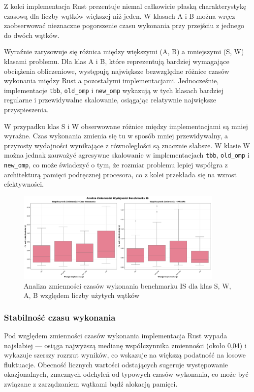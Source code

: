 Z kolei implementacja Rust prezentuje niemal całkowicie płaską charakterystykę czasową dla liczby wątków większej niż jeden. W klasach A i B można wręcz zaobserwować nieznaczne pogorszenie czasu wykonania przy przejściu z jednego do dwóch wątków.

Wyraźnie zarysowuje się różnica między większymi (A, B) a mniejszymi (S, W) klasami problemu. Dla klas A i B, które reprezentują bardziej wymagające obciążenia obliczeniowe, występują największe bezwzględne różnice czasów wykonania między Rust a pozostałymi implementacjami. Jednocześnie, implementacje \texttt{tbb}, \texttt{old\_omp} i \texttt{new\_omp} wykazują w tych klasach bardziej regularne i przewidywalne skalowanie, osiągając relatywnie największe przyspieszenia.

W przypadku klas S i W obserwowane różnice między implementacjami są mniej wyraźne. Czas wykonania zmienia się tu w sposób mniej przewidywalny, a przyrosty wydajności wynikające z równoległości są znacznie słabsze. W klasie W można jednak zauważyć agresywne skalowanie w implementacjach \texttt{tbb}, \texttt{old\_omp} i \texttt{new\_omp}, co może świadczyć o tym, że rozmiar problemu lepiej współgra z architekturą pamięci podręcznej procesora, co z kolei przekłada się na wzrost efektywności.

\begin{figure}[H]
    \centering
    \includegraphics[width=0.9\textwidth]{analiza/images/parallel/is/x86/is_analiza_zmiennosci.png}
    \caption{Analiza zmienności czasów wykonania benchmarku IS dla klas S, W, A, B względem liczby użytych wątków}
    \label{is_analiza_zmiennosci_x86}
\end{figure}
\subsubsection{Stabilność czasu wykonania}
Pod względem zmienności czasów wykonania implementacja Rust wypada najsłabiej — osiąga najwyższą medianę współczynnika zmienności (około 0,04) i wykazuje szerszy rozrzut wyników, co wskazuje na większą podatność na losowe fluktuacje. Obecność licznych wartości odstających sugeruje występowanie okazjonalnych, znacznych odchyleń od typowych czasów wykonania, co może być związane z zarządzaniem wątkami bądź alokacją pamięci.


